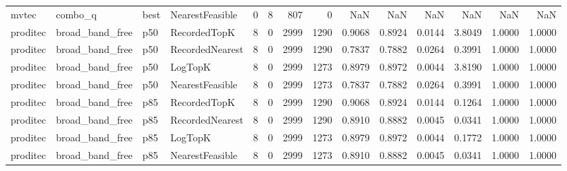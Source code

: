 \begin{tabular}{llllrrrrrrrrrr}
   mvtec &              combo\_q &   best & NearestFeasible &           0 &          8 &            807 &                   0 &            NaN &             NaN &                       NaN &            NaN &                    NaN &                     NaN \\
proditec &      broad\_band\_free &    p50 &    RecordedTopK &           8 &          0 &           2999 &                1290 &         0.9068 &          0.8924 &                    0.0144 &         3.8049 &                 1.0000 &                  1.0000 \\
proditec &      broad\_band\_free &    p50 & RecordedNearest &           8 &          0 &           2999 &                1290 &         0.7837 &          0.7882 &                    0.0264 &         0.3991 &                 1.0000 &                  1.0000 \\
proditec &      broad\_band\_free &    p50 &         LogTopK &           8 &          0 &           2999 &                1273 &         0.8979 &          0.8972 &                    0.0044 &         3.8190 &                 1.0000 &                  1.0000 \\
proditec &      broad\_band\_free &    p50 & NearestFeasible &           8 &          0 &           2999 &                1273 &         0.7837 &          0.7882 &                    0.0264 &         0.3991 &                 1.0000 &                  1.0000 \\
proditec &      broad\_band\_free &    p85 &    RecordedTopK &           8 &          0 &           2999 &                1290 &         0.9068 &          0.8924 &                    0.0144 &         0.1264 &                 1.0000 &                  1.0000 \\
proditec &      broad\_band\_free &    p85 & RecordedNearest &           8 &          0 &           2999 &                1290 &         0.8910 &          0.8882 &                    0.0045 &         0.0341 &                 1.0000 &                  1.0000 \\
proditec &      broad\_band\_free &    p85 &         LogTopK &           8 &          0 &           2999 &                1273 &         0.8979 &          0.8972 &                    0.0044 &         0.1772 &                 1.0000 &                  1.0000 \\
proditec &      broad\_band\_free &    p85 & NearestFeasible &           8 &          0 &           2999 &                1273 &         0.8910 &          0.8882 &                    0.0045 &         0.0341 &                 1.0000 &                  1.0000 \\

\end{tabular}
